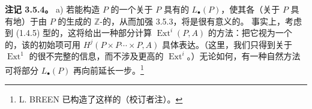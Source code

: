 \textbf{注记 3.5.4。} a) 若能构造 $P$ 的一个关于 $P$ 具有的 $L_\bullet(P)$，使其各（关于 $P$ 具有地）于由 $P$ 的生成的 $\mathbb Z$-的，从而加强 3.5.3，将是很有意义的。
事实上，考虑到 (1.4.5) 型的，这将给出一种部分计算 $\operatorname{Ext}^i(P,A)$ 的方法：把它视为一个的，该的初始项可用 $H^j(P\times P\cdots\times P,A)$ 具体表达。（这里，我们只得到关于 $\operatorname{Ext}^1$ 的很不完整的信息，而不涉及更高的 $\operatorname{Ext}^i$。）无论如何，有一种自然方法可将部分 $L_\bullet(P)$ 再向前延长一步。\footnote{L. BREEN 已构造了这样的（校订者注）。}

